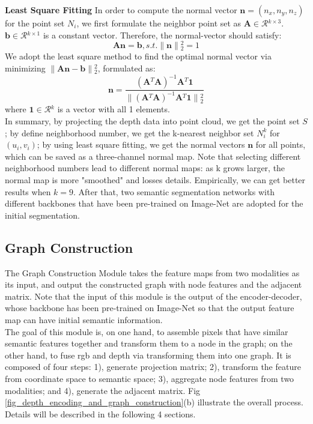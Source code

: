 ﻿\documentclass[journal]{IEEEtran}
\begin{document}
    \textbf{Least Square Fitting}  In order to compute the normal vector ${\mathbf{n}}= (n_{x},n_{y},n_{z})$ for the point set $N_{i}$, we first formulate the neighbor point set as $\mathbf{A} \in \mathcal{R}{^{k \times 3}}$. $\mathbf{b} \in \mathcal{R}{^{k \times 1}}$ is a constant vector. Therefore, the normal-vector should satisfy:
    \begin{equation}
    \mathbf{A}{\mathbf{n}}=\mathbf{b}, s.t.\|{\mathbf{n}}\|{_2^2}=1
    \end{equation}
    We adopt the least square method to find the optimal normal vector via minimizing $ \|\mathbf{A}{\mathbf{n}}-\mathbf{b}\|{_2^2}$, formulated as:
    \begin{equation}
    \mathbf{n}=\frac{(\mathbf{A}{^T}\mathbf{A})^{-1}\mathbf{A}{^T}\mathbf{1}}{\|(\mathbf{A}{^T}\mathbf{A})^{-1}\mathbf{A}{^T}\mathbf{1}\|{_2^2}} 
    \end{equation}
    where $\mathbf{1}\in \mathcal{R}{^k}$ is a vector with all 1 elements. \\   

 
    In summary, by projecting the depth data into point cloud, we get the point set $S$; by define neighborhood number, we get the k-nearest neighbor set $N_i^k$ for $(u_i, v_i)$; by using least square fitting, we get the normal vectors $ \mathbf{n}$ for all points, which can be saved as a three-channel normal map. Note that selecting different neighborhood numbers lead to different normal maps: as k grows larger, the normal map is more "smoothed" and losses details. Empirically, we can get better results when $k=9$. After that, two semantic segmentation networks with different backbones that have been pre-trained on Image-Net are adopted for the initial segmentation.
    \\   

\subsection{Graph Construction}   \label{sec_sub_construct_graph}
   
    The Graph Construction Module takes the feature maps from two modalities as its input, and output the constructed graph with node features and the adjacent matrix. Note that the input of this module is the output of the encoder-decoder, whose backbone has been pre-trained on Image-Net so that the output feature map can have initial semantic information. \\   
    
  
    The goal of this module is, on one hand, to assemble pixels that have similar semantic features together and transform them to a node in the graph; on the other hand, to fuse rgb and depth via transforming them into one graph. It is composed of four steps: 1), generate projection matrix; 2), transform the feature from coordinate space to semantic space; 3), aggregate node features from two modalities; and 4), generate the adjacent matrix. Fig \ref{fig_depth_encoding_and_graph_construction}(b) illustrate the overall process. Details will be described in the following 4 sections. \\   
\end{document}
